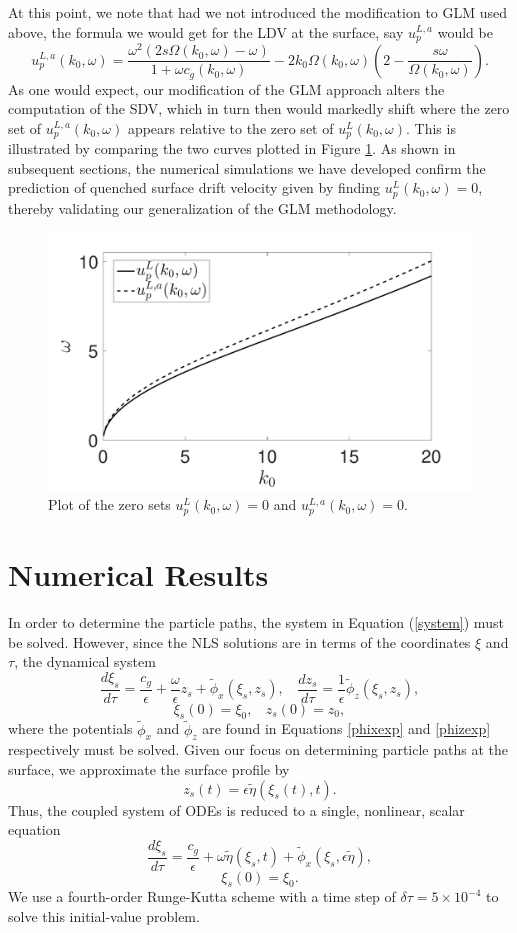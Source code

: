 \documentclass{JFM_Style/jfm}
\begin{document}
At this point, we note that had we not introduced the modification to GLM used above, the formula we would get for the LDV at the surface, say $u_{p}^{L,a}$ would be 
\[
u^{L,a}_{p}(k_{0},\omega) =  \frac{ \omega^{2}(2s\Omega(k_{0},\omega) - \omega)}{1+\omega c_{g}(k_{0},\omega)} - 2k_{0}\Omega(k_{0},\omega)\left( 2 - \frac{s\omega}{\Omega(k_{0},\omega)} \right). 
\]
As one would expect, our modification of the GLM approach alters the computation of the SDV, which in turn then would markedly shift where the zero set of $u^{L,a}_{p}(k_{0},\omega)$ appears relative to the zero set of $u^{L}_{p}(k_{0},\omega)$.  This is illustrated by comparing the two curves plotted in Figure \ref{fig:zerodriftk0}.  As shown in subsequent sections, the numerical simulations we have developed confirm the prediction of quenched surface drift velocity given by finding $u^{L}_{p}(k_{0},\omega)=0$, thereby validating our generalization of the GLM methodology.  
\begin{figure}
\centering
\includegraphics[width=.55\textwidth]{zero_return_shear}
\caption{\small Plot of the zero sets $u^{L}_{p}(k_{0},\omega)=0$ and $u^{L,a}_{p}(k_{0},\omega)=0$.}
\label{fig:zerodriftk0}
\end{figure}

\section{Numerical Results}
In order to determine the particle paths, the system in Equation (\ref{system}) must be solved.  However, since the NLS solutions are in terms of the coordinates $\xi$ and $\tau$, the dynamical system
\[
\frac{d \xi_{s}}{d\tau} =  \frac{c_{g}}{\epsilon} + \frac{\omega}{\epsilon}z_{s} + \tilde{\phi}_{x}(\xi_{s},z_{s}), ~~~~ \frac{dz_{s}}{d\tau} = \frac{1}{\epsilon} \tilde{\phi}_{z}(\xi_{s},z_{s}),
\]
\[
\xi_s(0)=\xi_0, ~~~~ z_s(0)=z_0,
\]
where the potentials $\tilde{\phi}_{x}$ and $\tilde{\phi}_{z}$ are found in Equations \eqref{phixexp} and \eqref{phizexp} respectively must be solved.  Given our focus on determining particle paths at the surface, we approximate the surface profile by
\[
z_{s}(t) = \epsilon \tilde{\eta}(\xi_{s}(t),t). 
\]
Thus, the coupled system of ODEs is reduced to a single, nonlinear, scalar equation
\[
\frac{d \xi_{s}}{d\tau} =  \frac{c_{g}}{\epsilon} + \omega\tilde{\eta}(\xi_{s},t) + \tilde{\phi}_{x}(\xi_{s},\epsilon\tilde{\eta}),
\]
\[
\xi_s(0)=\xi_0.
\]
We use a fourth-order Runge-Kutta scheme with a time step of $\delta \tau = 5\times10^{-4}$ to solve this initial-value problem.  
\end{document}
